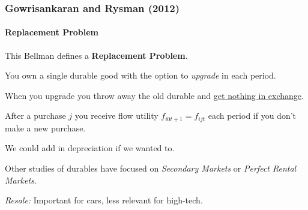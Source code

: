 \documentclass[11pt,aspectratio=169]{beamer}
\newenvironment{l_itemize}{\itemize\addtolength{\itemsep}{+7pt}}{\enditemize}
\begin{document}


\begin{frame}
\frametitle{Gowrisankaran and Rysman (2012)}
\framesubtitle{Replacement Problem}\small
This Bellman defines a \textbf{Replacement Problem}.
\begin{l_itemize}\footnotesize
\item[$-$] You own a single durable good with the option to \textit{upgrade} in each period.
\item[$-$] When you upgrade you throw away the old durable and \underline{get nothing in exchange}.
\item[$-$] After a purchase $j$  you receive flow utility $f_{i0t+1} = f_{ijt}$ each period if you don't make a new purchase.
\item[$-$] We could add in depreciation if we wanted to.
\item[$-$] Other studies of durables have focused on \textit{Secondary Markets} or \textit{Perfect Rental Markets}.
\item[$-$] \textit{Resale:} Important for cars, less relevant for high-tech.
\end{l_itemize}
\end{frame}
\end{document}
